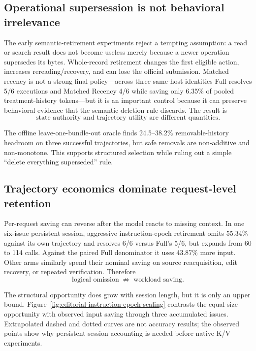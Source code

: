 \documentclass[11pt]{article}
\begin{document}
\subsection{Operational supersession is not behavioral irrelevance}

The early semantic-retirement experiments reject a tempting assumption: a read
or search result does not become useless merely because a newer operation
supersedes its bytes.  Whole-record retirement changes the first eligible
action, increases rereading/recovery, and can lose the official submission.
Matched recency is not a strong final policy---across three same-host identities
Full resolves 5/6 executions and Matched Recency 4/6 while saving only 6.35\%
of pooled treatment-history tokens---but it is an important control because it
can preserve behavioral evidence that the semantic deletion rule discards.
The result is
\[
\boxed{\text{state authority and trajectory utility are different quantities}.}
\]

The offline leave-one-bundle-out oracle finds 24.5--38.2\% removable-history
headroom on three successful trajectories, but safe removals are non-additive
and non-monotone.  This supports structured selection while ruling out a simple
``delete everything superseded'' rule.

\subsection{Trajectory economics dominate request-level retention}

Per-request saving can reverse after the model reacts to missing context.  In
one six-issue persistent session, aggressive instruction-epoch retirement
omits 55.34\% against its own trajectory and resolves 6/6 versus Full's 5/6,
but expands from 60 to 114 calls.  Against the paired Full denominator it uses
43.87\% more input.  Other arms similarly spend their nominal saving on source
reacquisition, edit recovery, or repeated verification.  Therefore
\[
\boxed{\text{logical omission}\;\not\Rightarrow\;\text{workload saving}.}
\]

The structural opportunity does grow with session length, but it is only an
upper bound.  Figure~\ref{fig:editorial-instruction-epoch-scaling} contrasts the
equal-size opportunity with observed input saving through three accumulated
issues.  Extrapolated dashed and dotted curves are not accuracy results; the
observed points show why persistent-session accounting is needed before native
K/V experiments.
\end{document}
